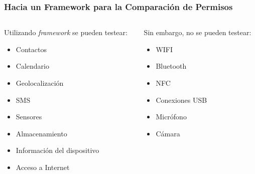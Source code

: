 \begin{frame}
 \frametitle{Hacia un Framework para la Comparación de Permisos}
 \begin{columns}
  \begin{column}[]{.5\textwidth}
   Utilizando \emph{framework} se pueden testear:
   \begin{itemize}
	\item Contactos
	\item Calendario
	\item Geolocalización
	\item SMS\structure *
	\item Sensores
	\item Almacenamiento
	\item Información del dispositivo
	\item Acceso a Internet
   \end{itemize}
  \end{column}
  \pause
  \begin{column}[]{.5\textwidth}
   Sin embargo, no se pueden testear:
   \begin{itemize}
    \item \alert {WIFI}
    \item \alert {Bluetooth}
    \item \alert {NFC}
    \item \alert {Conexiones USB}
    \item \alert {Micrófono}
    \item \alert {Cámara}
   \end{itemize}
  \end{column}
 \end{columns}
\end{frame}
